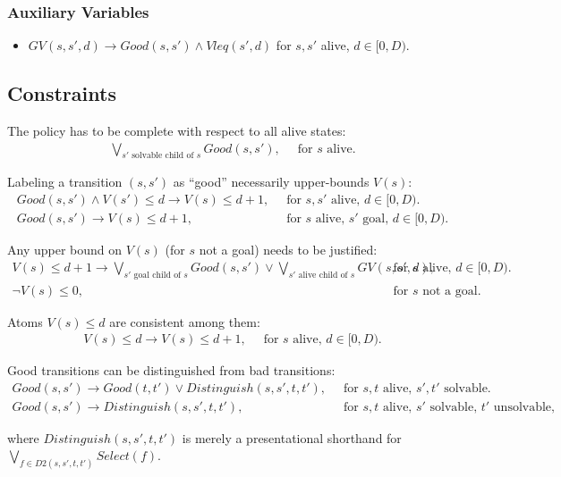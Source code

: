 \documentclass[a4paper]{article}
\begin{document}
\subsubsection{Auxiliary Variables}
\begin{itemize}
 \item $GV(s, s', d) \rightarrow Good(s, s') \land Vleq(s', d)$ for $s, s'$ alive, $d \in [0, D)$.
\end{itemize}

\subsection{Constraints}

\noindent The policy has to be complete with respect to all alive states:
\begin{align}
\bigvee_{s' \text{ solvable child of } s} Good(s, s'),&\;\; \text{for $s$ alive.}
\end{align}


\noindent Labeling a transition $(s, s')$ as ``good'' necessarily upper-bounds $V(s)$:
\begin{align}
 Good(s, s') \land V(s') \leq d \rightarrow V(s) \leq d+1,&\;\; \text{for $s, s'$ alive, $d \in [0, D)$.} \\
 Good(s, s') \rightarrow V(s) \leq d+1,&\;\; \text{for $s$ alive, $s'$ goal, $d \in [0, D)$.}
\end{align}

\noindent Any upper bound on $V(s)$ (for $s$ not a goal) needs to be justified:
\begin{align}
 V(s) \leq d+1 \rightarrow \bigvee_{s' \text{ goal child of } s} Good(s, s') \lor
                           \bigvee_{s' \text{ alive child of } s} GV(s, s', d),&
                           \;\; \text{for $s$ alive, $d \in [0, D)$.} \\
 \neg V(s) \leq 0,&\;\; \text{for $s$ not a goal.}
\end{align}

\noindent Atoms $V(s) \leq d$ are consistent among them:
\begin{align}
 V(s) \leq d \rightarrow V(s) \leq d+1,&\;\; \text{for $s$ alive, $d \in [0, D)$.}
\end{align}

\noindent Good transitions can be distinguished from bad transitions:
\begin{align}
 Good(s, s') \rightarrow Good(t, t') \lor
 Distinguish(s, s', t, t'),&\;\; \text{for $s, t$ alive, $s', t'$ solvable.} \\
 Good(s, s') \rightarrow
 Distinguish(s, s', t, t'),&\;\; \text{for $s, t$ alive, $s'$ solvable, $t'$ unsolvable,}
\end{align}

\noindent where $Distinguish(s, s', t, t')$ is merely a presentational shorthand for $\bigvee_{f \in D2(s, s', t, t')} Select(f)$.




\end{document}
